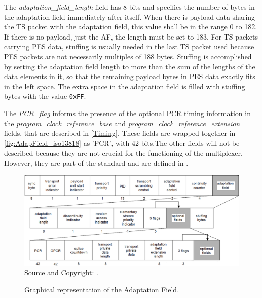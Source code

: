\documentclass[12pt,a4paper]{article}
\begin{document}
The \textit{adaptation\hspace{0.1mm}\_\hspace{0.1mm}field\hspace{0.1mm}\_\hspace{0.1mm}length} field has 8 bits and specifies the number of bytes in the adaptation field immediately after itself. When there is payload data sharing the TS packet with the adaptation field, this value shall be in the range 0 to 182. If there is no payload, just the AF, the length must be set to 183. For TS packets carrying PES data, stuffing is usually needed in the last TS packet used because PES packets are not necessarily multiples of 188 bytes. Stuffing is accomplished by setting the adaptation field length to more than the sum of the lengths of the data elements in it, so that the remaining payload bytes in PES data exactly fits in the left space. The extra space in the adaptation field is filled with stuffing bytes with the value \texttt{0xFF}.

The \textit{PCR\hspace{0.1mm}\_\hspace{0.1mm}flag} informs the presence of the optional PCR timing information in the \textit{program\hspace{0.1mm}\_\hspace{0.1mm}clock\hspace{0.1mm}\_\hspace{0.1mm}reference\hspace{0.1mm}\_\hspace{0.1mm}base} and \textit{program\hspace{0.1mm}\_\hspace{0.1mm}clock\hspace{0.1mm}\_\hspace{0.1mm}reference\hspace{0.1mm}\_\hspace{0.1mm}extension} fields, that are described in \autoref{Timing}. These fields are wrapped together in \autoref{fig:AdapField_iso13818} as 'PCR', with 42 bits.The other fields will not be described because they are not crucial for the functioning of the multiplexer. However, they are part of the standard and are defined in .

\begin{figure}
\centering
\caption{Graphical representation of the Adaptation Field.}
\includegraphics[width=1\linewidth]{pictures/AdapField_iso13818.png}
\\Source and Copyright: .
\label{fig:AdapField_iso13818}
\end{figure}
\end{document}

